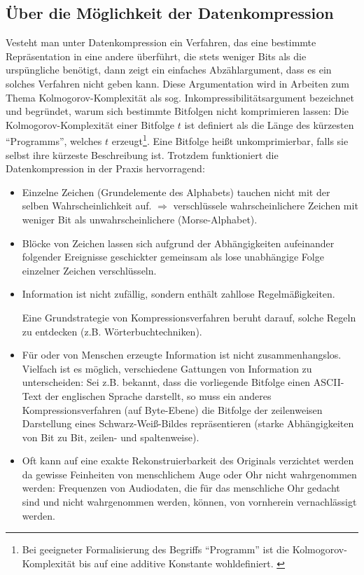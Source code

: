\documentclass[a4paper,12pt]{article}
\begin{document}
\subsection{Über die Möglichkeit der Datenkompression}
 Vesteht man unter Datenkompression ein Verfahren, das eine bestimmte Repräsentation in eine andere überführt, die stets weniger Bits als die urspüngliche benötigt, dann zeigt ein einfaches Abzählargument, dass es ein solches Verfahren nicht geben kann. Diese Argumentation wird in Arbeiten zum Thema Kolmogorov-Komplexität als sog. Inkompressibilitätsargument bezeichnet und begründet, warum sich bestimmte Bitfolgen nicht komprimieren lassen: Die Kolmogorov-Komplexität einer Bitfolge $t$ ist definiert als die Länge des kürzesten "`Programms"', welches $t$ erzeugt\footnote{\footnotesize{Bei geeigneter Formalisierung des Begriffs
"`Programm"' ist die Kolmogorov-Komplexität bis auf eine additive Konstante wohldefiniert.\cite{Li} }}. Eine Bitfolge heißt unkomprimierbar, falls sie selbst ihre kürzeste Beschreibung ist.
Trotzdem funktioniert die Datenkompression in der Praxis hervorragend:
\begin{itemize}
	\item Einzelne Zeichen (Grundelemente des Alphabets) tauchen nicht mit der selben Wahrscheinlichkeit auf. $\Rightarrow$ 
verschlüssele wahrscheinlichere Zeichen mit weniger Bit als unwahrscheinlichere (Morse-Alphabet).
\item Blöcke von Zeichen lassen sich aufgrund der Abhängigkeiten aufeinander folgender Ereignisse geschickter gemeinsam als lose unabhängige Folge einzelner Zeichen verschlüsseln.  
\item Information ist nicht zufällig, sondern enthält  zahllose Regelmäßigkeiten.
\par
 Eine Grundstrategie von Kompressionsverfahren beruht darauf, solche Regeln zu entdecken (z.B. Wörterbuchtechniken).
\item  Für oder von Menschen erzeugte Information ist nicht zusammenhangslos. Vielfach ist es möglich, verschiedene Gattungen von Information zu unterscheiden: Sei z.B. bekannt, dass die vorliegende Bitfolge einen ASCII-Text der englischen Sprache darstellt, so muss ein anderes Kompressionsverfahren (auf Byte-Ebene) die Bitfolge der zeilenweisen Darstellung eines Schwarz-Weiß-Bildes repräsentieren (starke Abhängigkeiten von Bit zu Bit, zeilen- und spaltenweise).
\item Oft kann auf eine exakte Rekonstruierbarkeit des Originals verzichtet werden da gewisse Feinheiten von menschlichem Auge oder Ohr nicht wahrgenommen werden:  Frequenzen von Audiodaten, die für das menschliche Ohr gedacht sind und nicht wahrgenommen werden, können, von vornherein vernachlässigt werden.
\end{itemize}
\end{document}
